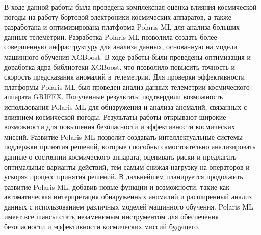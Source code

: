 \documentclass[14pt, a4paper]{../cls/coursework}
\begin{document}
    \newpage

    \titleformat{\section}[block]{\large\bfseries\filcenter}{}{0em}{}

    В ходе данной работы была проведена комплексная оценка влияния космической погоды на работу бортовой электроники космических аппаратов, а также разработана и оптимизирована платформа Polaris ML для анализа больших данных телеметрии.
    Разработка Polaris ML позволила создать более совершенную инфраструктуру для анализа данных, основанную на модели машинного обучения XGBoost. В ходе работы были проведены оптимизация и доработка ядра библиотеки XGBoost, что позволило повысить точность и скорость предсказания аномалий в телеметрии.
    Для проверки эффективности платформы Polaris ML был проведен анализ данных телеметрии космического аппарата GRIFEX. Полученные результаты подтвердили возможность использования Polaris ML для обнаружения и анализа аномалий, связанных с влиянием космической погоды.
    Результаты работы открывают широкие возможности для повышения безопасности и эффективности космических миссий. Развитие Polaris ML позволит создавать интеллектуальные системы поддержки принятия решений, которые способны самостоятельно анализировать данные о состоянии космического аппарата, оценивать риски и предлагать оптимальные варианты действий, тем самым снижая нагрузку на операторов и ускоряя процесс принятия решений.
    В дальнейшем планируется продолжить развитие Polaris ML, добавив новые функции и возможности, такие как автоматическая интерпретация обнаруженных аномалий и расширенный анализ данных с использованием различных моделей машинного обучения. Polaris ML имеет все шансы стать незаменимым инструментом для обеспечения безопасности и эффективности космических миссий будущего.

    \newpage

    \printbibliography[heading=bibintoc,title={Список использованной литературы}]

    \newpage

    \appendix

    \renewcommand{\chaptermark}[1]{\markboth{}{}}
    \renewcommand{\sectionmark}[1]{\markright{\arabic{section}.\ #1}}

    \titleformat{\section}[block]{\hspace{\parindent}\textnormal\bfseries}{}{0em}{}
\end{document}
